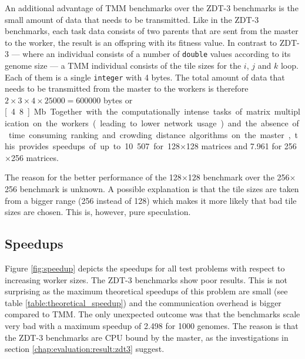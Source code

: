 An additional advantage of TMM benchmarks over the ZDT-3 benchmarks is the small amount of data that needs to be transmitted. Like in the ZDT-3 benchmarks, each task data consists of two parents that are sent from the master to the worker, the result is an offspring with its fitness value. In contrast to ZDT-3 --- where an individual consists of a number of \texttt{double} values according to its genome size --- a TMM individual consists of the tile sizes for the $i$, $j$ and $k$ loop. Each of them is a single \texttt{integer} with 4 bytes. The total amount of data that needs to be transmitted from the master to the workers is therefore $2 \times 3 \times 4 \times 25000 = 600000$ bytes or \unit[4.8]{Mb}. Together with the computationally intense tasks of matrix multiplication on the workers (leading to lower network usage) and the absence of time consuming ranking and crowding distance algorithms on the master, this provides speedups of up to 10.507 for 128$\times$128 matrices and 7.961 for 256$\times$256 matrices.

The reason for the better performance of the 128$\times$128 benchmark over the 256$\times$256 benchmark is unknown. A possible explanation is that the tile sizes are taken from a bigger range (256 instead of 128) which makes it more likely that bad tile sizes are chosen. This is, however, pure speculation.


\subsection{Speedups}
Figure \ref{fig:speedup} depicts the speedups for all test problems with respect to increasing worker sizes. The ZDT-3 benchmarks show poor results. This is not surprising as the maximum theoretical speedups of this problem are small (see table \ref{table:theoretical_speedup}) and the communication overhead is bigger compared to TMM. The only unexpected outcome was that the benchmarks scale very bad with a maximum speedup of 2.498 for 1000 genomes. The reason is that the ZDT-3 benchmarks are CPU bound by the master, as the investigations in section \ref{chap:evaluation:result:zdt3} suggest.

